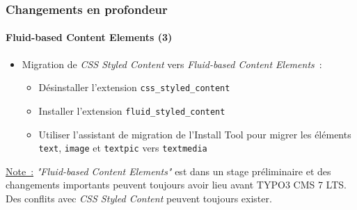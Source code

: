 \begin{frame}[fragile]
	\frametitle{Changements en profondeur}
	\framesubtitle{Fluid-based Content Elements (3)}

	\begin{itemize}

		\item Migration de \textit{CSS Styled Content} vers \textit{Fluid-based Content Elements}~:

			\begin{itemize}

				\item Désinstaller l'extension \texttt{css\_styled\_content}

				\item Installer l'extension \texttt{fluid\_styled\_content}

				\item Utiliser l'assistant de migration de l'Install Tool pour migrer les éléments
					\texttt{text}, \texttt{image} et \texttt{textpic} vers \texttt{textmedia}

			\end{itemize}
	\end{itemize}

	\vspace{1.4cm}

	\begingroup
		\color{red}
			\small
				\underline{Note~:} \textit{"Fluid-based Content Elements"} est dans un stage préliminaire
				et des changements importants peuvent toujours avoir lieu avant TYPO3 CMS 7 LTS.
				Des conflits avec \textit{CSS Styled Content} peuvent toujours exister.
			\normalsize
	\endgroup

\end{frame}



